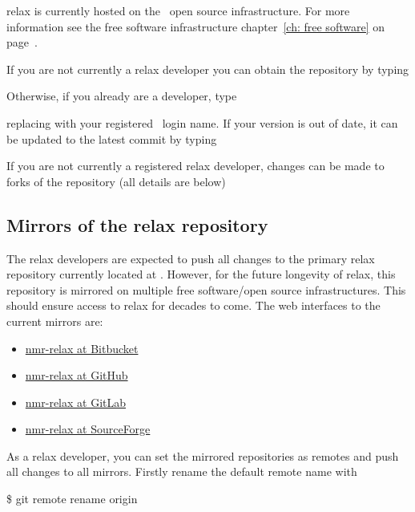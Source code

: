 relax is currently hosted on the \relaxHome\ open source infrastructure.
For more information see the free software infrastructure chapter~\ref{ch: free software} on page~\pageref{ch: free software}.

If you are not currently a relax developer you can obtain the repository by typing


Otherwise, if you already are a developer, type


replacing \prompt{[username]} with your registered \relaxHome\ login name.
If your version is out of date, it can be updated to the latest commit by typing


If you are not currently a registered relax developer, changes can be made to forks of the repository (all details are below)



\subsection{Mirrors of the relax repository} \label{sect: relax mirrors}

The relax developers are expected to push all changes to the primary relax repository currently located at \relaxHome.
However, for the future longevity of relax, this repository is mirrored on multiple free software/open source infrastructures.
This should ensure access to relax for decades to come.
The web interfaces to the current mirrors are:
\begin{itemize}
    \item \href{\relaxMirrorBBWebInterfaceURL}{nmr-relax at Bitbucket}
    \item \href{\relaxMirrorGHWebInterfaceURL}{nmr-relax at GitHub}
    \item \href{\relaxMirrorGLWebInterfaceURL}{nmr-relax at GitLab}
    \item \href{\relaxMirrorSFWebInterfaceURL}{nmr-relax at SourceForge}
\end{itemize}


As a relax developer, you can set the mirrored repositories as remotes and push all changes to all mirrors.
Firstly rename the default remote name  with

\begin{exampleenv}
\$ git remote rename origin \relaxHomeRemoteName
\end{exampleenv}

